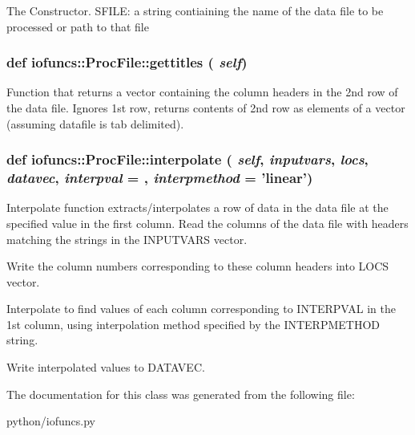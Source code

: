 The Constructor. SFILE: a string contiaining the name of the data file to be processed or path to that file \hypertarget{classiofuncs_1_1ProcFile_a88f142260af3fd70b1b8613da471f858}{
\subsubsection[{gettitles}]{\setlength{\rightskip}{0pt plus 5cm}def iofuncs::ProcFile::gettitles ( {\em self})}}
\label{d3/d16/classiofuncs_1_1ProcFile_a88f142260af3fd70b1b8613da471f858}


Function that returns a vector containing the column headers in the 2nd row of the data file. Ignores 1st row, returns contents of 2nd row as elements of a vector (assuming datafile is tab delimited). \hypertarget{classiofuncs_1_1ProcFile_ae7f8d6213747a8d1e41b771ec71cd2be}{
\subsubsection[{interpolate}]{\setlength{\rightskip}{0pt plus 5cm}def iofuncs::ProcFile::interpolate ( {\em self}, \/   {\em inputvars}, \/   {\em locs}, \/   {\em datavec}, \/   {\em interpval} = {}, \/   {\em interpmethod} = {\ttfamily 'linear'})}}
\label{d3/d16/classiofuncs_1_1ProcFile_ae7f8d6213747a8d1e41b771ec71cd2be}


Interpolate function extracts/interpolates a row of data in the data file at the specified value in the first column. Read the columns of the data file with headers matching the strings in the INPUTVARS vector.

Write the column numbers corresponding to these column headers into LOCS vector.

Interpolate to find values of each column corresponding to INTERPVAL in the 1st column, using interpolation method specified by the INTERPMETHOD string.

Write interpolated values to DATAVEC. 

The documentation for this class was generated from the following file:\begin{DoxyCompactItemize}
\item 
python/iofuncs.py\end{DoxyCompactItemize}
